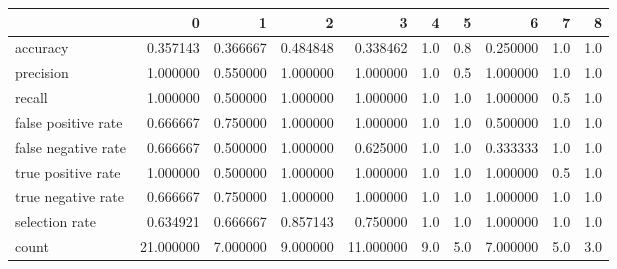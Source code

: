 \begin{tabular}{lrrrrrrrrr}
\toprule
{} &          0 &         1 &         2 &          3 &    4 &    5 &         6 &    7 &    8 \\
\midrule
accuracy            &   0.357143 &  0.366667 &  0.484848 &   0.338462 &  1.0 &  0.8 &  0.250000 &  1.0 &  1.0 \\
precision           &   1.000000 &  0.550000 &  1.000000 &   1.000000 &  1.0 &  0.5 &  1.000000 &  1.0 &  1.0 \\
recall              &   1.000000 &  0.500000 &  1.000000 &   1.000000 &  1.0 &  1.0 &  1.000000 &  0.5 &  1.0 \\
false positive rate &   0.666667 &  0.750000 &  1.000000 &   1.000000 &  1.0 &  1.0 &  0.500000 &  1.0 &  1.0 \\
false negative rate &   0.666667 &  0.500000 &  1.000000 &   0.625000 &  1.0 &  1.0 &  0.333333 &  1.0 &  1.0 \\
true positive rate  &   1.000000 &  0.500000 &  1.000000 &   1.000000 &  1.0 &  1.0 &  1.000000 &  0.5 &  1.0 \\
true negative rate  &   0.666667 &  0.750000 &  1.000000 &   1.000000 &  1.0 &  1.0 &  1.000000 &  1.0 &  1.0 \\
selection rate      &   0.634921 &  0.666667 &  0.857143 &   0.750000 &  1.0 &  1.0 &  1.000000 &  1.0 &  1.0 \\
count               &  21.000000 &  7.000000 &  9.000000 &  11.000000 &  9.0 &  5.0 &  7.000000 &  5.0 &  3.0 \\
\bottomrule
\end{tabular}
